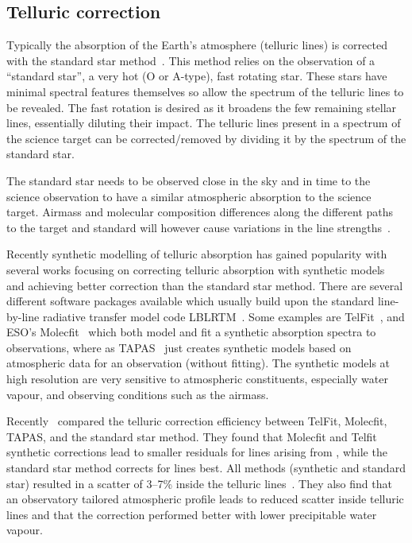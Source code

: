 
\subsection{Telluric correction}
\label{sec:telluric_correction}

Typically the absorption of the Earth's atmosphere (telluric lines) is corrected with the standard star method~\citep[e.g.][]{vacca_method_2003}.
This method relies on the observation of a ``standard star'', a very hot (O or A-type), fast rotating star.
These stars have minimal spectral features themselves so allow the spectrum of the telluric lines to be revealed.
The fast rotation is desired as it broadens the few remaining stellar lines, essentially diluting their impact.
The telluric lines present in a spectrum of the science target can be corrected/removed by dividing it by the spectrum of the standard star.

The standard star needs to be observed close in the sky and in time to the science observation to have a similar atmospheric absorption to the science target.
Airmass and molecular composition differences along the different paths to the target and standard will however cause variations in the line strengths~\citep{bailey_correcting_2007}.

Recently synthetic modelling of telluric absorption has gained popularity with several works focusing on correcting telluric absorption with synthetic models~\citep[e.g.][]{bailey_correcting_2007, cotton_atmospheric_2014, seifahrt_synthesising_2010} and achieving better correction than the standard star method.
There are several different software packages available which usually build upon the standard line-by-line radiative transfer model code {LBLRTM}~\citep{clough_linebyline_1995}.
Some examples are {TelFit}~\citep{gullikson_correcting_2014}, and ESO's {Molecfit}~\citep{smette_molecfit_2015} which both model and fit a synthetic absorption spectra to observations, where as {TAPAS}~\citep{bertaux_tapas_2014} just creates synthetic models based on atmospheric data for an observation (without fitting).
The synthetic models at high resolution are very sensitive to atmospheric constituents, especially water vapour, and observing conditions such as the airmass.

Recently~\citet{ulmer-moll_telluric_2018} compared the telluric correction efficiency between {TelFit}, {Molecfit}, {TAPAS}, and the standard star method.
They found that {Molecfit} and {Telfit} synthetic corrections lead to smaller residuals for lines arising from , while the standard star method corrects for  lines best.
All methods (synthetic and standard star) resulted in a scatter of 3--7\% inside the telluric lines~\citep{ulmer-moll_telluric_2018}.
They also find that an observatory tailored atmospheric profile leads to reduced scatter inside telluric lines and that the correction performed better with lower precipitable water vapour.

